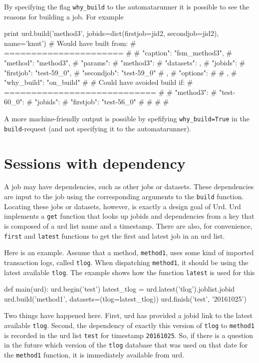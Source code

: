 By specifying the flag \texttt{why\_build} to the automatarunner it is
possible to see the reasons for building a job.  For example\\
\begin{python}
  print urd.build('method3', jobids=dict(firstjob=jid2, secondjob=jid2), name='knut')
# Would have built from:
# ======================
# {
#     "caption": "fsm_method3", 
#     "method": "method3", 
#     "params": {
#         "method3": {
#             "datasets": {}, 
#             "jobids": {
#                 "firstjob": "test-59_0", 
#                 "secondjob": "test-59_0"
#             }, 
#             "options": {}
#         }
#     }, 
#     "why_build": "on_build"
# }
# Could have avoided build if:
# ============================
# {
#     "method3": {
#         "test-60_0": {
#             "jobids": {
#                 "firstjob": "test-56_0"
#             }
#         }
#     }
# }
\end{python}
A more machine-friendly output is possible by spefifying
\texttt{why\_build=True} in the \texttt{build}-request (and not
specifying it to the automatarunner).



\newpage
\section{Sessions with dependency}

A job may have dependencies, such as other jobs or datasets.  These
dependencies are input to the job using the corresponding arguments to
the \texttt{build} function.  Locating these jobs or datasets,
however, is exactly a design goal of Urd.  Urd implements a
\texttt{get} function that looks up jobids and dependencies from a key
that is composed of a urd list name and a timestamp.  There are also,
for convenience, \texttt{first} and \texttt{latest} functions to get
the first and latest job in an urd list.

Here is an example.  Assume that a method, \texttt{method1}, uses some
kind of imported transaction logs, called \texttt{tlog}.  When
dispatching \texttt{method1}, it should be using the latest available
\texttt{tlog}.  The example shows how the function \texttt{latest} is
used for this\\
\begin{python}
def main(urd):
  urd.begin('test')
  latest_tlog = urd.latest('tlog').joblist.jobid
  urd.build('method1', datasets=(tlog=latest_tlog))
  urd.finish('test', '20161025')
\end{python}
Two things have happened here.  First, urd has provided a jobid link
to the latest available \texttt{tlog}.  Second, the dependency of
exactly this version of \texttt{tlog} to \texttt{method1} is recorded
in the urd list \texttt{test} for timestamp \texttt{20161025}.  So, if
there is a question in the future which version of the \texttt{tlog}
database that was used on that date for the \texttt{method1} function,
it is immediately available from urd.

